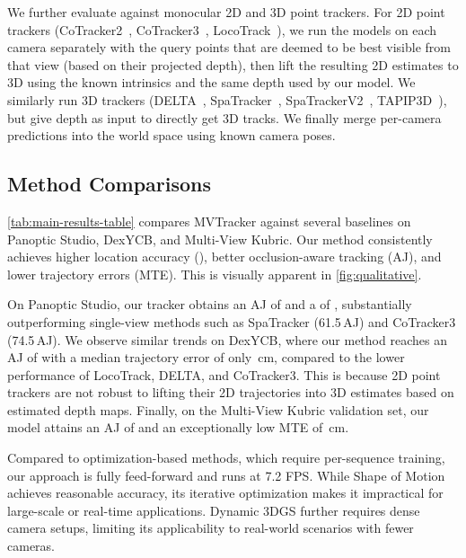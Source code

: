 \documentclass[10pt,twocolumn,letterpaper]{article}
\begin{document}
We further evaluate against monocular 2D and 3D point trackers. For 2D point trackers (CoTracker2~\cite{karaev2023cotracker}, CoTracker3~\cite{karaev24cotracker3}, LocoTrack~\cite{cho2024local}), we run the models on each camera separately with the query points that are deemed to be best visible from that view (based on their projected depth), then lift the resulting 2D estimates to 3D using the known intrinsics and the same depth used by our model. 
We similarly run 3D trackers (DELTA~\cite{ngo2024delta}, SpaTracker~\cite{xiao2024spatialtracker}, SpaTrackerV2~\cite{xiao2025spatialtrackerv2}, TAPIP3D~\cite{tapip3d}), but give depth as input to directly get 3D tracks. We finally merge per-camera predictions into the world space using known camera poses. 

\subsection{Method Comparisons} \label{sec:results}

\cref{tab:main-results-table} compares MVTracker against several baselines on Panoptic Studio, DexYCB, and Multi-View Kubric. Our method consistently achieves higher location accuracy (\davg), better occlusion-aware tracking (AJ), and lower trajectory errors (MTE). This is visually apparent in \cref{fig:qualitative}. 

On Panoptic Studio, our tracker obtains an AJ of  and a \davg of , substantially outperforming single-view methods such as SpaTracker (61.5\,AJ) and CoTracker3 (74.5\,AJ). We observe similar trends on DexYCB, where our method reaches an AJ of  with a median trajectory error of only \,cm, compared to the lower performance of LocoTrack, DELTA, and CoTracker3. This is because 2D point trackers are not robust to lifting their 2D trajectories into 3D estimates based on estimated depth maps. Finally, on the Multi-View Kubric validation set, our model attains an AJ of  and an exceptionally low MTE of \,cm.

Compared to optimization-based methods, which require per-sequence training, our approach is fully feed-forward and runs at 7.2 FPS. While Shape of Motion achieves reasonable accuracy, its iterative optimization makes it impractical for large-scale or real-time applications. Dynamic 3DGS further requires dense camera setups, limiting its applicability to real-world scenarios with fewer cameras.
\end{document}
